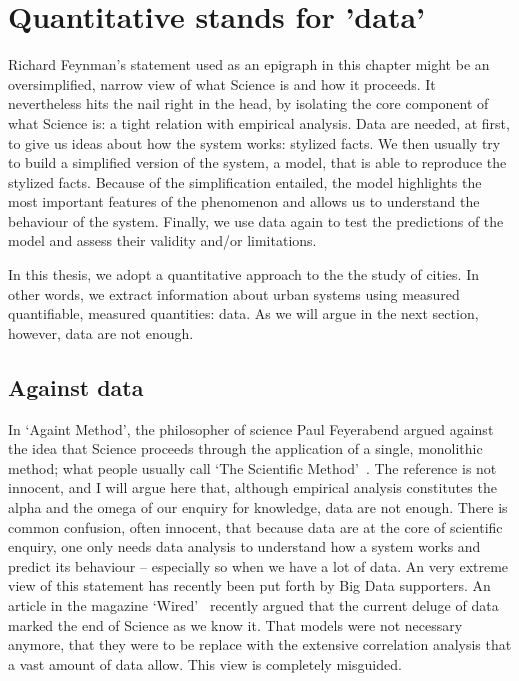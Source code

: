 \section{Quantitative stands for 'data'}
\label{sec:quantitative_stands_for_data_}

Richard Feynman's statement used as an epigraph in this chapter might be an
oversimplified, narrow view of what Science is and how it proceeds. It
nevertheless hits the nail right in the head, by isolating the core component of
what Science is: a tight relation with empirical analysis. Data are needed, at
first, to give us ideas about how the system works: stylized facts. We then
usually try to build a simplified version of the system, a model, that is able
to reproduce the stylized facts. Because of the simplification entailed, the
model highlights the most important features of the phenomenon and allows us to
understand the behaviour of the system. Finally, we use data again to test the
predictions of the model and assess their validity and/or limitations.

In this thesis, we adopt a quantitative approach to the the study of cities. In
other words, we extract information about urban systems using measured
quantifiable, measured quantities: data. As we will argue in the next section,
however, data are not enough.


\subsection{Against data}
\label{sec:against_data}

In `Againt Method', the philosopher of science Paul Feyerabend argued against
the idea that Science proceeds through the application of a single, monolithic
method; what people usually call `The Scientific Method'~\cite{Feyerabend:1975}.
The reference is not innocent, and I will argue here that, although empirical
analysis constitutes the alpha and the omega of our enquiry for knowledge, data
are not enough.
There is common confusion, often innocent, that because data are at the core of
scientific enquiry, one only needs data analysis to understand how a system
works and predict its behaviour -- especially so when we have a lot of data. An
very extreme view of this statement has recently been put forth by Big Data
supporters. An article in the magazine `Wired'~\cite{Anderson:2008} recently
argued that the current deluge of data marked the end of Science as we know it.
That models were not necessary anymore, that they were to be replace with the
extensive correlation analysis that a vast amount of data allow. This view is
completely misguided.\\

